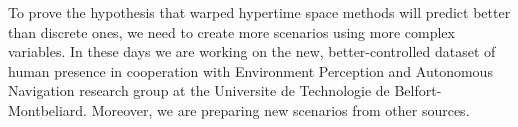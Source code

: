 To prove the hypothesis that warped hypertime space methods will predict better than discrete ones, we need to create more scenarios using more complex variables.
In these days we are working on the new, better-controlled dataset of human presence in cooperation with Environment Perception and Autonomous Navigation research group at the Universite de Technologie de Belfort-Montbeliard.
Moreover, we are preparing new scenarios from other sources.
